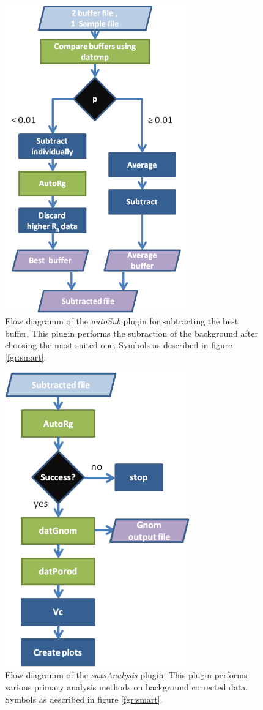 \documentclass[preprint,pdf]{iucr}              %
\begin{document}
\begin{figure}
\centering
\includegraphics[width=8cm]{autosub.png}%
\caption{Flow diagramm of the \textit{autoSub} plugin for subtracting the best
buffer.
This plugin performs the subraction of the background after choosing the most suited one.
Symbols as described in figure \ref{fgr:smart}.}
\label{fgr:autosub}
\end{figure}

\begin{figure}
\centering
\includegraphics[width=8cm]{analysis.png}%
\caption{Flow diagramm of the \textit{saxsAnalysis} plugin.
This plugin performs various primary analysis methods on background corrected data.
Symbols as described in figure \ref{fgr:smart}.}
\label{fgr:analysis}
\end{figure}
\end{document}

